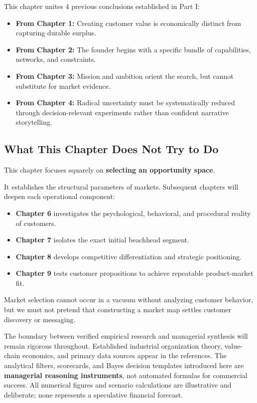 This chapter unites 4 previous conclusions established in Part I:
\begin{itemize}[leftmargin=12pt,itemsep=1pt,topsep=1pt]
  \item \textbf{From Chapter 1:} Creating customer value is economically distinct from capturing durable surplus.
  \item \textbf{From Chapter 2:} The founder begins with a specific bundle of capabilities, networks, and constraints.
  \item \textbf{From Chapter 3:} Mission and ambition orient the search, but cannot substitute for market evidence.
  \item \textbf{From Chapter 4:} Radical uncertainty must be systematically reduced through decision-relevant experiments rather than confident narrative storytelling.
\end{itemize}

\subsection{What This Chapter Does Not Try to Do}

This chapter focuses squarely on \textbf{selecting an opportunity space}.

It establishes the structural parameters of markets. Subsequent chapters will deepen each operational component:
\begin{itemize}[leftmargin=12pt,itemsep=1pt,topsep=1pt]
  \item \textbf{Chapter 6} investigates the psychological, behavioral, and procedural reality of customers.
  \item \textbf{Chapter 7} isolates the exact initial beachhead segment.
  \item \textbf{Chapter 8} develops competitive differentiation and strategic positioning.
  \item \textbf{Chapter 9} tests customer propositions to achieve repeatable product-market fit.
\end{itemize}

Market selection cannot occur in a vacuum without analyzing customer behavior, but we must not pretend that constructing a market map settles customer discovery or messaging.

The boundary between verified empirical research and managerial synthesis will remain rigorous throughout. Established industrial organization theory, value-chain economics, and primary data sources appear in the references. The analytical filters, scorecards, and Bayes decision templates introduced here are \textbf{managerial reasoning instruments}, not automated formulas for commercial success. All numerical figures and scenario calculations are illustrative and deliberate; none represents a speculative financial forecast.
